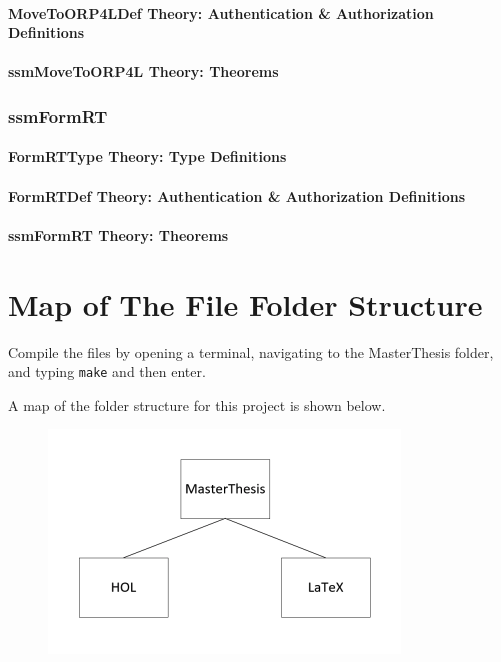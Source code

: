 \documentclass[hidelinks,12pt,a4paper]{report}
\begin{document}
\begin{appendices}
\subsubsection{MoveToORP4LDef Theory: Authentication \& Authorization Definitions}
\subsubsection{ssmMoveToORP4L Theory: Theorems}

\subsection{ssmFormRT}
\subsubsection{FormRTType Theory: Type Definitions}
\subsubsection{FormRTDef Theory: Authentication \& Authorization Definitions}
\subsubsection{ssmFormRT Theory: Theorems}

\chapter{Map of The File Folder Structure}\label{foldermap}
Compile the files by opening a terminal, navigating to the MasterThesis folder, and typing \texttt{make} and then enter.

A map of the folder structure for this project is shown below.  
\begin{figure}[t]
\includegraphics[width=\textwidth]{../figures/folders}
\end{figure}


\end{appendices}
\end{document}
